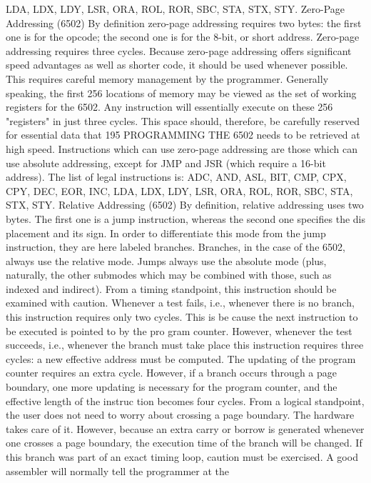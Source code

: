 LDA, LDX, LDY, LSR, ORA, ROL, ROR, SBC, STA, STX, STY.
Zero-Page Addressing (6502)
By definition zero-page addressing requires two bytes: the first
one is for the opcode; the second one is for the 8-bit, or short
address.
Zero-page addressing requires three cycles. Because zero-page
addressing offers significant speed advantages as well as shorter
code, it should be used whenever possible. This requires careful
memory management by the programmer. Generally speaking,
the first 256 locations of memory may be viewed as the set of
working registers for the 6502. Any instruction will essentially
execute on these 256 "registers" in just three cycles. This space
should, therefore, be carefully reserved for essential data that
195
PROGRAMMING THE 6502
needs to be retrieved at high speed.
Instructions which can use zero-page addressing are those
which can use absolute addressing, except for JMP and JSR
(which require a 16-bit address).
The list of legal instructions is: ADC, AND, ASL, BIT, CMP,
CPX, CPY, DEC, EOR, INC, LDA, LDX, LDY, LSR, ORA,
ROL, ROR, SBC, STA, STX, STY.
Relative Addressing (6502)
By definition, relative addressing uses two bytes. The first one
is a jump instruction, whereas the second one specifies the dis
placement and its sign. In order to differentiate this mode from
the jump instruction, they are here labeled branches. Branches,
in the case of the 6502, always use the relative mode. Jumps
always use the absolute mode (plus, naturally, the other submodes
which may be combined with those, such as indexed and
indirect). From a timing standpoint, this instruction should be
examined with caution. Whenever a test fails, i.e., whenever there
is no branch, this instruction requires only two cycles. This is be
cause the next instruction to be executed is pointed to by the pro
gram counter. However, whenever the test succeeds, i.e., whenever
the branch must take place this instruction requires three cycles: a
new effective address must be computed. The updating of the
program counter requires an extra cycle. However, if a branch
occurs through a page boundary, one more updating is necessary
for the program counter, and the effective length of the instruc
tion becomes four cycles.
From a logical standpoint, the user does not need to worry about
crossing a page boundary. The hardware takes care of it. However,
because an extra carry or borrow is generated whenever one crosses
a page boundary, the execution time of the branch will be changed.
If this branch was part of an exact timing loop, caution must be
exercised.
A good assembler will normally tell the programmer at the

